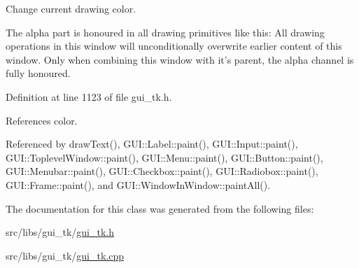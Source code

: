 Change current drawing color. 

The alpha part is honoured in all drawing primitives like this\-: All drawing operations in this window will unconditionally overwrite earlier content of this window. Only when combining this window with it's parent, the alpha channel is fully honoured. 

Definition at line 1123 of file gui\-\_\-tk.\-h.



References color.



Referenced by draw\-Text(), G\-U\-I\-::\-Label\-::paint(), G\-U\-I\-::\-Input\-::paint(), G\-U\-I\-::\-Toplevel\-Window\-::paint(), G\-U\-I\-::\-Menu\-::paint(), G\-U\-I\-::\-Button\-::paint(), G\-U\-I\-::\-Menubar\-::paint(), G\-U\-I\-::\-Checkbox\-::paint(), G\-U\-I\-::\-Radiobox\-::paint(), G\-U\-I\-::\-Frame\-::paint(), and G\-U\-I\-::\-Window\-In\-Window\-::paint\-All().



The documentation for this class was generated from the following files\-:\begin{DoxyCompactItemize}
\item 
src/libs/gui\-\_\-tk/\hyperlink{gui__tk_8h}{gui\-\_\-tk.\-h}\item 
src/libs/gui\-\_\-tk/\hyperlink{gui__tk_8cpp}{gui\-\_\-tk.\-cpp}\end{DoxyCompactItemize}
